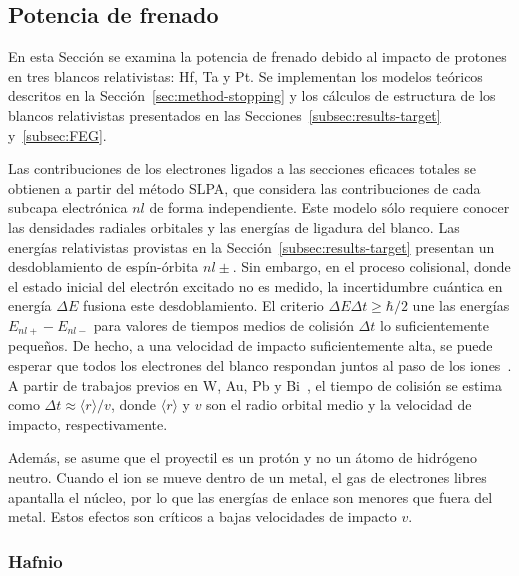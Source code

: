 \subsection{Potencia de frenado}
\label{subsec:results-stopping}

En esta Sección se examina la potencia de frenado debido al impacto de 
protones en tres blancos relativistas: Hf, Ta y Pt. Se implementan los 
modelos teóricos descritos en la Sección~\ref{sec:method-stopping} y los
cálculos de estructura de los blancos relativistas presentados en las 
Secciones~\ref{subsec:results-target} y~\ref{subsec:FEG}.

Las contribuciones de los electrones ligados a las secciones eficaces 
totales se obtienen a partir del método SLPA, que considera las 
contribuciones de cada subcapa electrónica $nl$ de forma independiente.
Este modelo sólo requiere conocer las densidades radiales orbitales y
las energías de ligadura del blanco. Las energías relativistas provistas
en la Sección~\ref{subsec:results-target} presentan un desdoblamiento de 
espín-órbita $nl\pm$. Sin embargo, en el proceso colisional, donde el 
estado inicial del electrón excitado no es medido, la incertidumbre 
cuántica en energía $\Delta E$ fusiona este desdoblamiento. El criterio 
$\Delta E\Delta t\geq\hbar/2$ une las energías $E_{nl+}-E_{nl-}$ para 
valores de tiempos medios de colisión $\Delta t$ lo suficientemente 
pequeños. De hecho, a una velocidad de impacto suficientemente alta, se 
puede esperar que todos los electrones del blanco respondan juntos al 
paso de los iones~\cite{Lindhard:53,Chu:72}. A partir de trabajos 
previos en W, Au, Pb y Bi~\cite{Montanari:09}, el tiempo de colisión se 
estima como $\Delta t\approx\langle r\rangle/v$, donde $\langle r\rangle$ 
y $v$ son el radio orbital medio y la velocidad de impacto, 
respectivamente.

Además, se asume que el proyectil es un protón y no un átomo de 
hidrógeno neutro. Cuando el ion se mueve dentro de un metal, el gas de 
electrones libres apantalla el núcleo, por lo que las energías de enlace 
son menores que fuera del metal. Estos efectos son críticos a bajas 
velocidades de impacto $v$.

\subsubsection{Hafnio}

